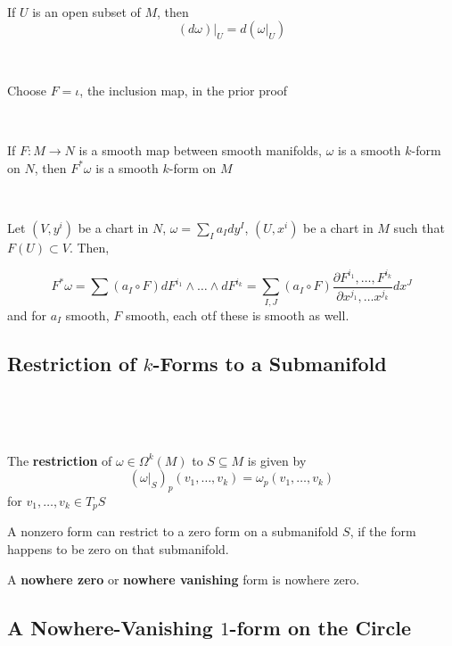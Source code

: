 \documentclass{article}
\begin{document}
\begin{corollary}
  \

  If $U$ is an open subset of $M$, then $$(d\omega) \vert_U = d(\omega \vert_U)$$
\end{corollary}

\begin{customproof}
  \

  Choose $F = \iota$, the inclusion map, in the prior proof
\end{customproof}

\begin{proposition}
  \

  If $F: M\to N$ is a smooth map between smooth manifolds, $\omega$ is a smooth $k$-form on $N$, then $F^*\omega$ is a smooth $k$-form on $M$
\end{proposition}

\begin{customproof}
  \

  Let $(V, y^i)$ be a chart in $N$, $\omega = \sum_I a_I dy^I$, $(U, x^i)$ be a chart in $M$ such that $F(U) \subset V$. Then,

  $$F^*\omega = \sum (a_I \circ F) dF^{i_1} \wedge \dots \wedge dF^{i_k} = \sum_{I,J}(a_I \circ F) \frac{\partial F^{i_1}, \dots, F^{i_k}}{\partial x^{j_1}, \dots x^{j_k}} dx^J$$and for $a_I$ smooth, $F$ smooth, each otf these is smooth as well.
\end{customproof}

\subsection{Restriction of $k$-Forms to a Submanifold}
\

\begin{definition}
  \

  The \textbf{restriction} of $\omega \in \Omega^k(M)$ to $S \subseteq M$ is given by $$(\omega \vert_S)_p(v_1, \dots, v_k) = \omega_p(v_1, \dots, v_k)$$for $v_1, \dots, v_k \in T_pS$

  A nonzero form can restrict to a zero form on a submanifold $S$, if the form happens to be zero on that submanifold.

  A \textbf{nowhere zero} or \textbf{nowhere vanishing} form is nowhere zero.
\end{definition}

\subsection{A Nowhere-Vanishing $1$-form on the Circle}
\
\end{document}
